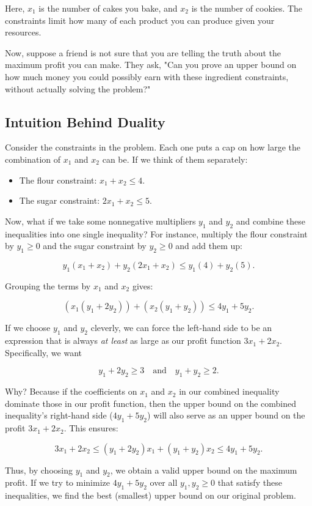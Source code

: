 Here, $x_1$ is the number of cakes you bake, and $x_2$ is the number of cookies. The constraints limit how many of each product you can produce given your resources.

Now, suppose a friend is not sure that you are telling the truth about the maximum profit you can make. They ask, "Can you prove an upper bound on how much money you could possibly earn with these ingredient constraints, without actually solving the problem?"

\subsection*{Intuition Behind Duality}

Consider the constraints in the problem. Each one puts a cap on how large the combination of $x_1$ and $x_2$ can be. If we think of them separately:

\begin{itemize}
\item The flour constraint: $x_1 + x_2 \leq 4$.
\item The sugar constraint: $2x_1 + x_2 \leq 5$.
\end{itemize}
Now, what if we take some nonnegative multipliers $y_1$ and $y_2$ and combine these inequalities into one single inequality? For instance, multiply the flour constraint by $y_1 \geq 0$ and the sugar constraint by $y_2 \geq 0$ and add them up:

\[
y_1(x_1 + x_2) + y_2(2x_1 + x_2) \leq y_1(4) + y_2(5).
\]

Grouping the terms by $x_1$ and $x_2$ gives:

\[
(x_1(y_1 + 2y_2)) + (x_2(y_1 + y_2)) \leq 4y_1 + 5y_2.
\]

If we choose $y_1$ and $y_2$ cleverly, we can force the left-hand side to be an expression that is always \emph{at least} as large as our profit function $3x_1 + 2x_2$. Specifically, we want

\[
y_1 + 2y_2 \geq 3 \quad \text{and} \quad y_1 + y_2 \geq 2.
\]

Why? Because if the coefficients on $x_1$ and $x_2$ in our combined inequality dominate those in our profit function, then the upper bound on the combined inequality's right-hand side ($4y_1 + 5y_2$) will also serve as an upper bound on the profit $3x_1 + 2x_2$. This ensures:

\[
3x_1 + 2x_2 \leq (y_1+2y_2)x_1 + (y_1 + y_2)x_2 \leq 4y_1 + 5y_2.
\]

Thus, by choosing $y_1$ and $y_2$, we obtain a valid upper bound on the maximum profit. If we try to minimize $4y_1 + 5y_2$ over all $y_1, y_2 \geq 0$ that satisfy these inequalities, we find the best (smallest) upper bound on our original problem.

